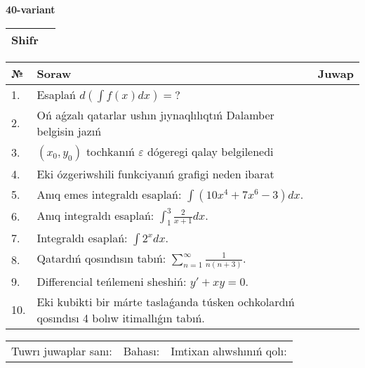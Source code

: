 \documentclass{article}
\begin{document}
  \egroup
  
  \newpage
  
  
  \textbf{40-variant}\\
  
  \bgroup
  \def\arraystretch{1.6} %
  
  \begin{tabular}{|m{5.7cm}|m{9.5cm}|}
  \hline
  Shifr & \\
  \hline
  \end{tabular}
  
  \vspace{1cm}
  
  \begin{tabular}{|m{0.7cm}|m{10cm}|m{4cm}|}
  \hline
  № & Soraw & Juwap \\
  \hline
  1. & Esaplań \(d\left( \int{f(x)dx} \right) = ?\) &  \\
  \hline
  2. & Oń aǵzalı qatarlar ushın jıynaqlılıqtıń Dalamber belgisin jazıń &  \\
  \hline
  3. & \((x_0,y_0)\) tochkanıń \(\varepsilon\) dógeregi qalay belgilenedi &  \\
  \hline
  4. & Eki ózgeriwshili funkciyanıń grafigi neden ibarat &  \\
  \hline
  5. & Anıq emes integraldı esaplań: \(\int{\left( 10x^{4} + 7x^{6} - 3 \right)dx}\). &  \\
  \hline
  6. & Anıq integraldı esaplań: \(\int_{1}^{3}\frac{2}{x + 1}dx\). &  \\
  \hline
  7. & Integraldı esaplań: \(\int{2^{x}dx}\). &  \\
  \hline
  8. & Qatardıń qosındısın tabıń: \(\sum_{n = 1}^{\infty}\frac{1}{n(n + 3)}\). &  \\
  \hline
  9. & Differencial teńlemeni sheshiń: \(y' + xy = 0\). &  \\
  \hline
  10. & Eki kubikti bir márte taslaǵanda túsken ochkolardıń qosındısı 4 bolıw itimallıǵın tabıń. &  \\
  \hline
  \end{tabular}
  
  \vspace{1cm}
  
  \begin{tabular}{lll}
  Tuwrı juwaplar sanı: \underline{\hspace{1.5cm}} & 
  Bahası: \underline{\hspace{1.5cm}} & 
  Imtixan alıwshınıń qolı: \underline{\hspace{2cm}} \\
  \end{tabular}
  
\end{document}
